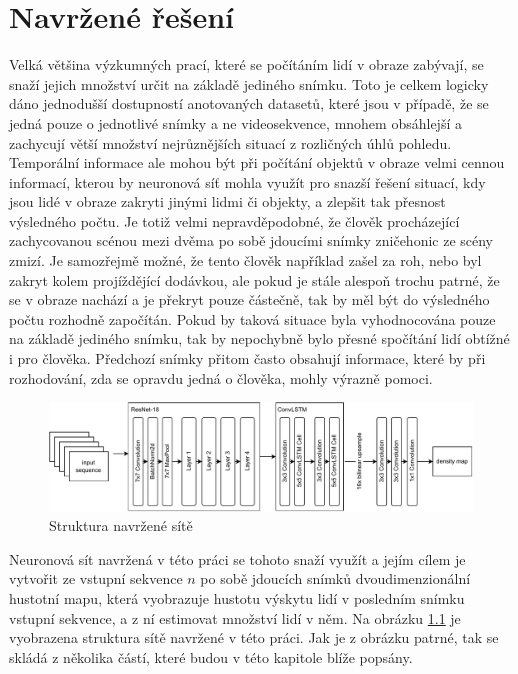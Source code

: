 \chapter{Navržené řešení}
\label{sec:Propesed_solution}

Velká většina výzkumných prací, které se počítáním lidí v obraze zabývají, se snaží jejich množství určit na základě jediného snímku.
Toto je celkem logicky dáno jednodušší dostupností anotovaných datasetů, které jsou v případě, že se jedná pouze o jednotlivé snímky a ne videosekvence, mnohem obsáhlejší a zachycují větší množství nejrůznějších situací z rozličných úhlů pohledu.
Temporální informace ale mohou být při počítání objektů v obraze velmi cennou informací, kterou by neuronová síť mohla využít pro snazší řešení situací, kdy jsou lidé v obraze zakryti jinými lidmi či objekty, a zlepšit tak přesnost výsledného počtu.
Je totiž velmi nepravděpodobné, že člověk procházející zachycovanou scénou mezi dvěma po sobě jdoucími snímky zničehonic ze scény zmizí.
Je samozřejmě možné, že tento člověk například zašel za roh, nebo byl zakryt kolem projíždějící dodávkou, ale pokud je stále alespoň trochu patrné, že se v obraze nachází a je překryt pouze částečně, tak by měl být do výsledného počtu rozhodně započítán. Pokud by taková situace byla vyhodnocována pouze na základě jediného snímku, tak by nepochybně bylo přesné spočítání lidí obtížné i pro člověka. Předchozí snímky přitom často obsahují informace, které by při rozhodování, zda se opravdu jedná o člověka, mohly výrazně pomoci.

\begin{figure}[h!]
	\centering
	\includegraphics[width=\textwidth]{Figures/solution/net_structure.pdf}
	\caption{Struktura navržené sítě}
	\label{fig:proposed_net}
\end{figure}

Neuronová sít navržená v této práci se tohoto snaží využít a jejím cílem je vytvořit ze vstupní sekvence \(n\) po sobě jdoucích snímků dvoudimenzionální hustotní mapu, která vyobrazuje hustotu výskytu lidí v posledním snímku vstupní sekvence, a z ní estimovat množství lidí v něm. Na obrázku \ref{fig:proposed_net} je vyobrazena struktura sítě navržené v této práci.
Jak je z obrázku patrné, tak se skládá z několika částí, které budou v této kapitole blíže popsány.




\endinput